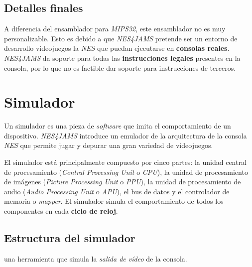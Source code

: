 \subsection{Detalles finales}\label{subsec:detalles-finales}

A diferencia del ensamblador para \textit{MIPS32},
este ensamblador no es muy personalizable.
Esto es debido a que \textit{NES4JAMS} pretende
ser un entorno de desarrollo  videojuegos  la \textit{NES}
que puedan ejecutarse en \textbf{consolas reales}.
\textit{NES4JAMS} da soporte para todas las
\textbf{instrucciones legales} presentes en la consola,
por lo que no es factible dar soporte para instrucciones
de terceros.


\section{Simulador}\label{sec:simulador}

Un simulador es una pieza de \textit{software} que imita el
comportamiento de un dispositivo.
\textit{NES4JAMS} introduce un emulador de la arquitectura
de la consola \textit{NES} que permite jugar y depurar
una gran variedad de videojuegos.

El simulador está principalmente compuesto por cinco partes:
la unidad central de procesamiento
(\textit{Central Processing Unit} o \textit{CPU}),
la unidad de procesamiento de imágenes
(\textit{Picture Processing Unit} o \textit{PPU}),
la unidad de procesamiento de audio
(\textit{Audio Processing Unit} o \textit{APU}),
el bus de datos y el controlador de memoria o \textit{mapper}.
El simulador simula el comportamiento de todos los componentes
en cada \textbf{ciclo de reloj}.

\subsection{Estructura del simulador}\label{subsec:estructura-del-simulador}

 una herramienta que
simula la \textit{salida de vídeo} de la consola.


